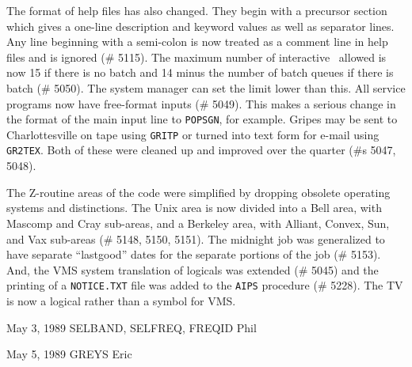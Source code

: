      The format of help files has also changed.  They begin with a
precursor section which gives a one-line description and keyword values
as well as separator lines.  Any line beginning with a semi-colon is now
treated as a comment line in help files and is ignored (\# 5115).  The
maximum number of interactive \AIPS\ allowed is now 15 if there is no
batch and 14 minus the number of batch queues if there is batch (\# 5050).
The system manager can set the limit lower than this.  All service
programs now have free-format inputs (\# 5049).  This makes a serious
change in the format of the main input line to {\tt POPSGN}, for example.
Gripes may be sent to Charlottesville on tape using {\tt GRITP} or
turned into text form for e-mail using {\tt GR2TEX}.  Both of these
were cleaned up and improved over the quarter (\#s 5047, 5048).

     The Z-routine areas of the code were simplified by dropping
obsolete operating systems and distinctions.  The Unix area is
now divided into a Bell area, with Mascomp and Cray sub-areas, and
a Berkeley area, with Alliant, Convex, Sun, and Vax sub-areas (\# 5148,
5150, 5151).  The midnight job was generalized to have separate
``lastgood'' dates for the separate portions of the job (\# 5153).
And, the VMS system translation of logicals was extended (\# 5045) and the
printing of a {\tt NOTICE.TXT} file was added to the {\tt AIPS} procedure
(\# 5228).  The TV is now a logical rather than a symbol for \hbox{VMS}.

\vfill\eject
{}
\parindent 0pt\smallpt

 {May 3, 1989} {SELBAND, SELFREQ, FREQID} {Phil}
   {
    }

 {May 5, 1989} {GREYS} {Eric}
   {
    }

